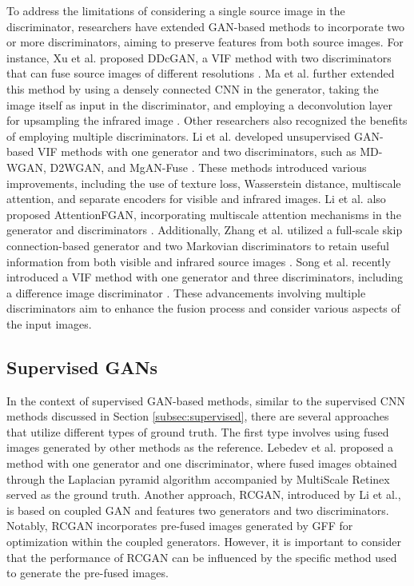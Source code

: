To address the limitations of considering a single source image in the discriminator, researchers have extended GAN-based methods to incorporate two or more discriminators, aiming to preserve features from both source images. For instance, Xu et al. proposed DDcGAN, a VIF method with two discriminators that can fuse source images of different resolutions \cite{xu2019learning}. Ma et al. further extended this method by using a densely connected CNN in the generator, taking the image itself as input in the discriminator, and employing a deconvolution layer for upsampling the infrared image \cite{ma2020ddcgan}. Other researchers also recognized the benefits of employing multiple discriminators. Li et al. developed unsupervised GAN-based VIF methods with one generator and two discriminators, such as MD-WGAN, D2WGAN, and MgAN-Fuse \cite{li2019infrared, li2020infrared, li2020multigrained}. These methods introduced various improvements, including the use of texture loss, Wasserstein distance, multiscale attention, and separate encoders for visible and infrared images. Li et al. also proposed AttentionFGAN, incorporating multiscale attention mechanisms in the generator and discriminators \cite{li2020attentionfgan}. Additionally, Zhang et al. utilized a full-scale skip connection-based generator and two Markovian discriminators to retain useful information from both visible and infrared source images \cite{zhang2021gan}. Song et al. recently introduced a VIF method with one generator and three discriminators, including a difference image discriminator \cite{song2022triple}. These advancements involving multiple discriminators aim to enhance the fusion process and consider various aspects of the input images.

\subsection{Supervised GANs}
\label{subsec:sGAN}

In the context of supervised GAN-based methods, similar to the supervised CNN methods discussed in Section \ref{subsec:supervised}, there are several approaches that utilize different types of ground truth. The first type involves using fused images generated by other methods as the reference. Lebedev et al. \cite{lebedev2019multisensor} proposed a method with one generator and one discriminator, where fused images obtained through the Laplacian pyramid algorithm accompanied by MultiScale Retinex served as the ground truth. Another approach, RCGAN, introduced by Li et al.\cite{li2019coupled}, is based on coupled GAN and features two generators and two discriminators. Notably, RCGAN incorporates pre-fused images generated by GFF \cite{li2013image} for optimization within the coupled generators. However, it is important to consider that the performance of RCGAN can be influenced by the specific method used to generate the pre-fused images.

